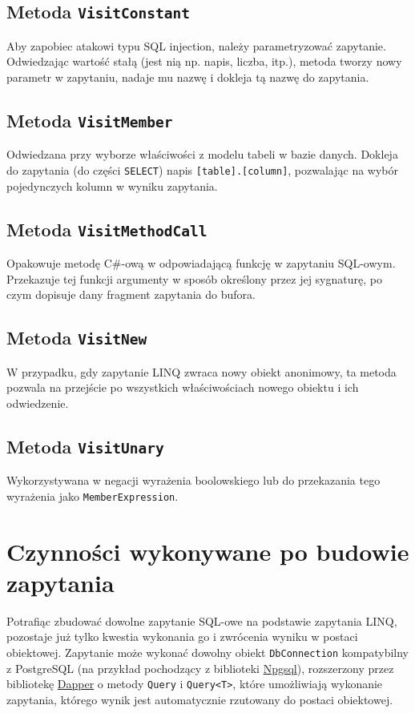 \subsection{Metoda \texttt{VisitConstant}}
Aby zapobiec atakowi typu SQL injection, należy parametryzować zapytanie. Odwiedzając wartość stałą (jest nią np. napis, liczba, itp.), metoda tworzy nowy parametr w zapytaniu, nadaje mu nazwę i dokleja tą nazwę do zapytania.

\subsection{Metoda \texttt{VisitMember}}
Odwiedzana przy wyborze właściwości z modelu tabeli w bazie danych. Dokleja do zapytania (do części \texttt{SELECT}) napis \texttt{[table].[column]}, pozwalając na wybór pojedynczych kolumn w wyniku zapytania.

\subsection{Metoda \texttt{VisitMethodCall}}
Opakowuje metodę C\#-ową w odpowiadającą funkcję w zapytaniu SQL-owym. Przekazuje tej funkcji argumenty w sposób określony przez jej sygnaturę, po czym dopisuje dany fragment zapytania do bufora.

\subsection{Metoda \texttt{VisitNew}}
W przypadku, gdy zapytanie LINQ zwraca nowy obiekt anonimowy, ta metoda pozwala na przejście po wszystkich właściwościach nowego obiektu i ich odwiedzenie.

\subsection{Metoda \texttt{VisitUnary}}
Wykorzystywana w negacji wyrażenia boolowskiego lub do przekazania tego wyrażenia jako \texttt{MemberExpression}.

\section{Czynności wykonywane po budowie zapytania}
Potrafiąc zbudować dowolne zapytanie SQL-owe na podstawie zapytania LINQ, pozostaje już tylko kwestia wykonania go i zwrócenia wyniku w postaci obiektowej. Zapytanie może wykonać dowolny obiekt \texttt{DbConnection} kompatybilny z PostgreSQL (na przykład pochodzący z biblioteki \href{http://www.npgsql.org/}{Npgsql}), rozszerzony przez bibliotekę \href{https://github.com/StackExchange/Dapper}{Dapper} o metody \texttt{Query} i \texttt{Query<T>}, które umożliwiają wykonanie zapytania, którego wynik jest automatycznie rzutowany do postaci obiektowej.


